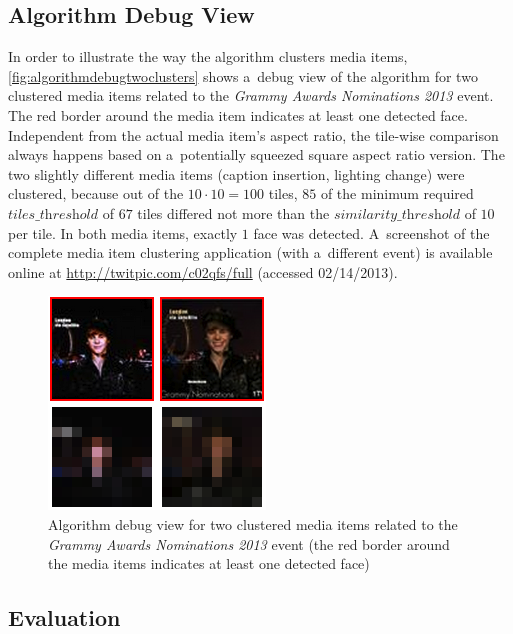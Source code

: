 \subsection{Algorithm Debug View}
\label{sec:algorithm-debug-view}

In order to illustrate the way the algorithm clusters media items,
\autoref{fig:algorithmdebugtwoclusters} shows a~debug view of the algorithm
for two clustered media items related to the 
\emph{Grammy Awards Nominations 2013} event.
The red border around the media item indicates at least one detected face.
Independent from the actual media item's aspect ratio,
the tile-wise comparison always happens based on a~potentially squeezed
square aspect ratio version.
The two slightly different media items (caption insertion, lighting change)
were clustered, because out of the $10 \cdot 10 = 100$ tiles,
$85$ of the minimum required $\textit{tiles\_threshold}$ of $67$ tiles differed not more
than the $\textit{similarity\_threshold}$ of $10$ per tile.
In both media items, exactly $1$ face was detected.
A~screenshot of the complete media item clustering application (with a~different event)
is available online at \url{http://twitpic.com/c02qfs/full} (accessed 02/14/2013).

\begin{figure}
  \centering
  \includegraphics[width=0.5\linewidth]{./algorithmdebug.png}
  \caption[Algorithm debug view for two clustered media items]
  {Algorithm debug view for two clustered media items
  related to the \emph{Grammy Awards Nominations 2013} event
  (the red border around the media items indicates at least one detected face)}
  \label{fig:algorithmdebugtwoclusters}
\end{figure}



\subsection{Evaluation}\label{sec:evaluation-chpater6}

